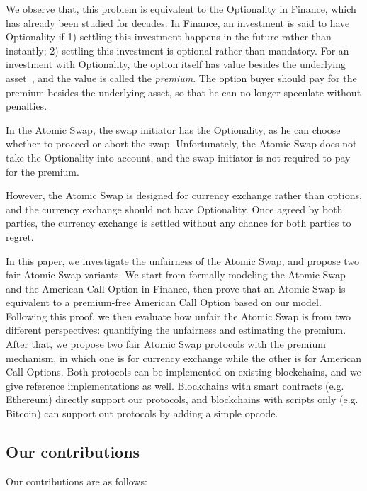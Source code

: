 We observe that, this problem is equivalent to the Optionality in Finance, which has already been studied for decades.
In Finance, an investment is said to have Optionality if 1) settling this investment happens in the future rather than instantly; 2) settling this investment is optional rather than mandatory.
For an investment with Optionality, the option itself has value besides the underlying asset~\cite{higham2004introduction}, and the value is called the \textit{premium}.
The option buyer should pay for the premium besides the underlying asset, so that he can no longer speculate without penalties.

In the Atomic Swap, the swap initiator has the Optionality, as he can choose whether to proceed or abort the swap.
Unfortunately, the Atomic Swap does not take the Optionality into account, and the swap initiator is not required to pay for the premium.

However, the Atomic Swap is designed for currency exchange rather than options, and the currency exchange should not have Optionality.
Once agreed by both parties, the currency exchange is settled without any chance for both parties to regret.

In this paper, we investigate the unfairness of the Atomic Swap, and propose two fair Atomic Swap variants.
We start from formally modeling the Atomic Swap and the American Call Option in Finance,
then prove that an Atomic Swap is equivalent to a premium-free American Call Option based on our model.
Following this proof, we then evaluate how unfair the Atomic Swap is from two different perspectives: quantifying the unfairness and estimating the premium.
After that, we propose two fair Atomic Swap protocols with the premium mechanism, in which one is for currency exchange while the other is for American Call Options.
Both protocols can be implemented on existing blockchains, and we give reference implementations as well.
Blockchains with smart contracts (e.g. Ethereum) directly support our protocols, and blockchains with scripts only (e.g. Bitcoin) can support out protocols by adding a simple opcode.



\subsection{Our contributions}

Our contributions are as follows:

